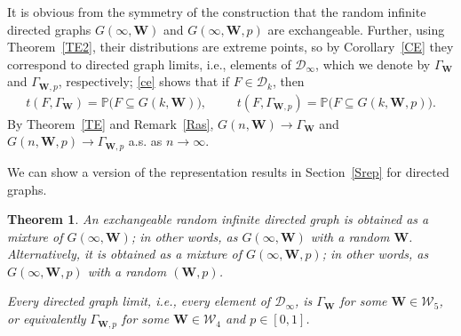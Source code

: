 \documentclass[11pt,reqno,tbtags]{amsart}
\numberwithin{equation}{section}
\newtheorem{theorem}{Theorem}[section]
\theoremstyle{definition}
\theoremstyle{remark}
\newcommand{\refT}[1]{Theorem~\ref{#1}}
\newcommand{\refC}[1]{Corollary~\ref{#1}}
\newcommand{\refR}[1]{Remark~\ref{#1}}
\newcommand{\refS}[1]{Section~\ref{#1}}
\newcommand\bigpar[1]{\bigl(#1\bigr)}
\newcommand\ntoo{\ensuremath{{n\to\infty}}}
\newcommand\ie{i.e.\spacefactor=1000}
\newcommand{\as}{a.s.\spacefactor=1000}
\renewcommand\P{\operatorname{\mathbb P{}}}
\newcommand\cD{\mathcal D}
\newcommand\cW{\mathcal W}
\renewcommand{\=}{:=}
\newcommand\oi{[0,1]}
\newcommand{\exch}{exchangeable}
\newcommand{\DUx}[1]{\cD_{#1}}
\newcommand{\cdoo}{\DUx{\infty}}
\newcommand{\gbwx}[1]{G(#1,\bW)}
\newcommand{\gbwoo}{\gbwx\infty}
\newcommand{\gbwn}{\gbwx{n}}
\newcommand{\gbwpx}[1]{G(#1,\bW,p)}
\newcommand{\gbwpoo}{\gbwpx\infty}
\newcommand{\gbwpn}{\gbwpx{n}}
\newcommand{\ubw}{\Gamma_{\bW}}
\newcommand{\ubwp}{\Gamma_{\bW,p}}
\newcommand{\bW}{\mathbf{W}}
\newcommand{\WW}{\cW_5}
\newcommand{\WWW}{\cW_4}
\begin{document}
It is obvious from the symmetry of the construction that the random
infinite directed graphs $\gbwoo$ and $\gbwpoo$ are \exch. Further,
using \refT{TE2}, their distributions are extreme points, so by
\refC{CE} they correspond to directed graph limits, \ie, elements of
$\cdoo$, which we denote by $\ubw$ and $\ubwp$, respectively;
\eqref{ce}
shows that if $F\in\cD_k$, then
\begin{align*}%
  t(F,\ubw)=\P\bigpar{F\subseteq \gbwx k},
&&&
  t(F,\ubwp)=\P\bigpar{F\subseteq \gbwpx k}.
\end{align*}
By \refT{TE} and \refR{Ras}, $\gbwn\to\ubw$ and $\gbwpn\to\ubwp$ \as{}
as \ntoo. 

We can show a version of the representation
results in \refS{Srep} for directed graphs.

\begin{theorem}\label{TD}
An \exch{} random infinite directed graph is obtained as a mixture of
$\gbwoo$; in other words, as $\gbwoo$ with a random $\bW$. 
Alternatively, it is obtained as a mixture of 
$\gbwpoo$; in other words, as $\gbwpoo$ with a random $(\bW,p)$. 

Every directed graph limit, \ie, every element of $\cdoo$, is $\ubw$
for some $\bW\in\WW$, or equivalently $\ubwp$ for some $\bW\in\WWW$
and $p\in\oi$. 
\end{theorem}
\end{document}
